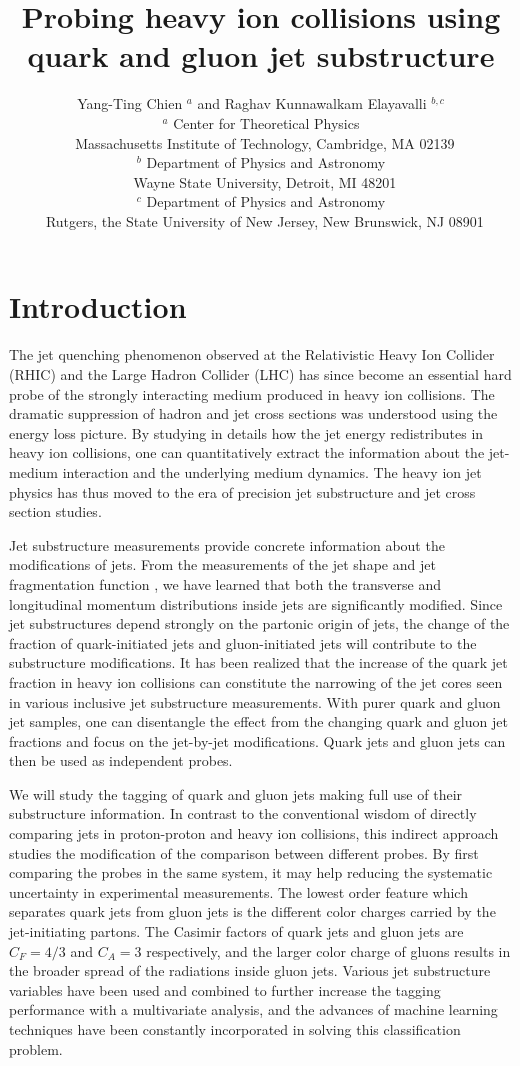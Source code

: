 \documentclass[notoc]{JHEP3}
\title{Probing heavy ion collisions using quark and gluon jet substructure}
\author{Yang-Ting Chien $^{a}$ and Raghav Kunnawalkam Elayavalli $^{b,c}$\\
$^{a}$ Center for Theoretical Physics\\
$~$ Massachusetts Institute of Technology, Cambridge, MA 02139\\
$^{b}$ Department of Physics and Astronomy\\
$~$ Wayne State University, Detroit, MI 48201\\
$^{c}$ Department of Physics and Astronomy\\
$~$ Rutgers, the State University of New Jersey, New Brunswick, NJ 08901
}
\begin{document}
\section{Introduction}
\label{sec:intro}



The jet quenching phenomenon observed at the Relativistic Heavy Ion Collider (RHIC) \cite{Adcox:2001jp,Adler:2002xw,Adcox:2004mh,Arsene:2004fa,Back:2004je,Adams:2005dq}
and the Large Hadron Collider (LHC)\cite{Aamodt:2010jd,Abelev:2012hxa,Abelev:2013kqa,Aad:2012vca,Aad:2014bxa,Chatrchyan:2013kwa,
Chatrchyan:2012gw,Chatrchyan:2014ava,Aad:2014wha,Chatrchyan:2013exa,
Adam:2015ewa,Chatrchyan:2012gt,Chatrchyan:2011sx,Chatrchyan:2012nia,Aad:2010bu,Aad:2013sla,Adam:2015doa,Aad:2015bsa,Khachatryan:2015lha} has since become an essential hard probe of the strongly interacting medium produced in heavy ion collisions. The dramatic suppression of hadron and jet cross sections was understood using the energy loss picture. By studying in details how the jet energy redistributes in heavy ion collisions, one can quantitatively extract the information about the jet-medium interaction and the underlying medium dynamics. The heavy ion jet physics has thus moved to the era of precision jet substructure and jet cross section studies.

Jet substructure measurements provide concrete information about the modifications of jets. From the measurements of the jet shape \cite{} and jet fragmentation function \cite{}, we have learned that both the transverse and longitudinal momentum distributions inside jets are significantly modified. Since jet substructures depend strongly on the partonic origin of jets, the change of the fraction of quark-initiated jets and gluon-initiated jets will contribute to the substructure modifications. It has been realized that the increase of the quark jet fraction in heavy ion collisions can constitute the narrowing of the jet cores seen in various inclusive jet substructure measurements. With purer quark and gluon jet samples, one can disentangle the effect from the changing quark and gluon jet fractions and focus on the jet-by-jet modifications. Quark jets and gluon jets can then be used as independent probes.

We will study the tagging of quark and gluon jets making full use of their substructure information. In contrast to the conventional wisdom of directly comparing jets in proton-proton and heavy ion collisions, this indirect approach studies the modification of the comparison between different probes. By first comparing the probes in the same system, it may help reducing the systematic uncertainty in experimental measurements. The lowest order feature which separates quark jets from gluon jets is the different color charges carried by the jet-initiating partons. The Casimir factors of quark jets and gluon jets are $C_F = 4/3$ and $C_A=3$ respectively, and the larger color charge of gluons results in the broader spread of the radiations inside gluon jets. Various jet substructure variables have been used and combined to further increase the tagging performance with a multivariate analysis, and the advances of machine learning techniques have been constantly incorporated in solving this classification problem.
\end{document}
